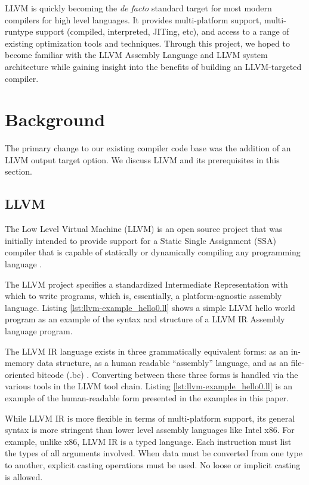 \documentclass[11pt,twocolumn]{article}
\begin{document}
LLVM is quickly becoming the \textit{de facto} standard target for most modern
compilers for high level languages.  It provides multi-platform
support, multi-runtype support (compiled, interpreted, JITing,
etc), and access to a range of existing optimization tools and
techniques. Through this project, we hoped to become familiar with the
LLVM Assembly Language and LLVM system architecture while gaining
insight into the benefits of building an LLVM-targeted compiler.

\section{Background}

The primary change to our existing compiler code base was the addition
of an LLVM output target option. We discuss LLVM and its prerequisites
in this section.

\subsection{LLVM}
\label{sec:LLVM}

The Low Level Virtual Machine (LLVM) is an open source project that
was initially intended to provide support for a Static Single
Assignment (SSA) compiler that is capable of statically or dynamically
compiling any programming language \cite{llvm.org}.

The LLVM project specifies a standardized Intermediate Representation
with which to write programs, which is, essentially, a platform-agnostic
assembly language. Listing \ref{lst:llvm-example_hello0.ll} shows a
simple LLVM hello world program as an example of the syntax and
structure of a LLVM IR Assembly language program.



The LLVM IR language exists in three grammatically equivalent forms:
as an in-memory data structure, as a human readable ``assembly''
language, and as an file-oriented bitcode (.bc) \cite{lattner-llvmlangref}.
Converting between these three forms is handled via the various tools
in the LLVM tool chain. Listing \ref{lst:llvm-example_hello0.ll} is an
example of the human-readable form presented in the examples in this paper.

While LLVM IR is more
flexible in terms of multi-platform support, its
general syntax is more stringent than lower level assembly languages
like Intel x86. For example, unlike x86, LLVM IR is a typed language.
Each instruction must list the types of all arguments involved. When
data must be converted from one type to another, explicit casting
operations must be used. No loose or implicit casting is allowed.
\end{document}
